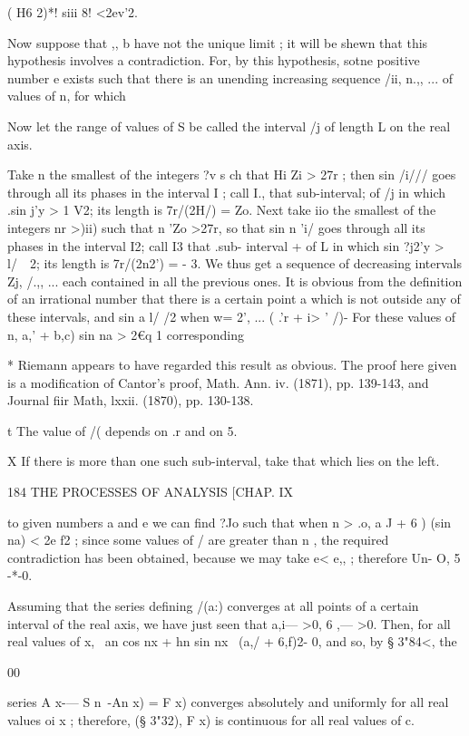 ( H6 2)*! siii 8! <2ev'2.

Now suppose that ,, b have not the unique limit ; it will be shewn
that this hypothesis involves a contradiction. For, by this
hypothesis, sotne positive number e exists such that there is an
unending increasing sequence /ii, n.,, ... of values of n, for which

Now let the range of values of S be called the interval /j of length L
on the real axis.

Take n the smallest of the integers ?v s ch that Hi Zi > 27r ; then
sin /i/// goes through all its phases in the interval I ; call I.,
that sub-interval; of /j in which .sin j'y > 1 V2; its length is
7r/(2H/) = Zo. Next take iio the smallest of the integers nr >)ii)
such that n 'Zo >27r, so that sin n 'i/ goes through all its phases in
the interval I2; call I3 that .sub- interval + of L in which sin ?j2'y
> l/\ \ 2; its length is 7r/(2n2') = - 3. We thus get a sequence of
decreasing intervals Zj, /.,, ... each contained in all the previous
ones. It is obvious from the definition of an irrational number that
there is a certain point a which is not outside any of these
intervals, and sin a l/ /2 when w= 2', ... ( .'r + i> ' /)- For these
values of n, a,' + b,c) sin na > 2€q 1%
corresponding

* Riemann appears to have regarded this result as obvious. The proof
here given is a modification of Cantor's proof, Math. Ann. iv. (1871),
pp. 139-143, and Journal fiir Math, lxxii. (1870), pp. 130-138.

t The value of /( depends on .r and on 5.

X If there is more than one such sub-interval, take that which lies on
the left.



184 THE PROCESSES OF ANALYSIS [CHAP. IX

to given numbers a and e we can find ?Jo such that when n > .o, a J +
6 ) (sin na) < 2e f2 ; since some values of / are greater than n , the
required contradiction has been obtained, because we may take e< e,, ;
therefore Un- O, 5 -*-0.

Assuming that the series defining /(a:) converges at all points of a
certain interval of the real axis, we have just seen that a,i— >0, 6
,— >0. Then, for all real values of x, \ an cos nx + hn sin nx \ (a,/
+ 6,f)2- 0, and so, by § 3"84<, the

00

series A x-— S n~-An x) = F x) converges absolutely and uniformly for
all real values oi x ; therefore, (§ 3"32), F x) is continuous for all
real values of c.

